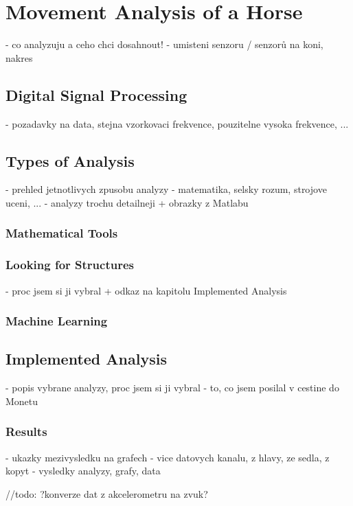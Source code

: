 \chapter{Movement Analysis of a Horse}
\label{HorseAnalysis}
- co analyzuju a ceho chci dosahnout!
- umisteni senzoru / senzorů na koni, nakres

\section{Digital Signal Processing}
- pozadavky na data, stejna vzorkovaci frekvence, pouzitelne vysoka frekvence, ...

\section{Types of Analysis}
- prehled jetnotlivych zpusobu analyzy - matematika, selsky rozum, strojove uceni, ...
- analyzy trochu detailneji + obrazky z Matlabu

\subsection{Mathematical Tools}

\subsection{Looking for Structures}
- proc jsem si ji vybral + odkaz na kapitolu Implemented Analysis

\subsection{Machine Learning}

\section{Implemented Analysis}
- popis vybrane analyzy, proc jsem si ji vybral
- to, co jsem posilal v cestine do Monetu

\subsection{Results}
- ukazky mezivysledku na grafech
- vice datovych kanalu, z hlavy, ze sedla, z kopyt
- vysledky analyzy, grafy, data


//todo: ?konverze dat z akcelerometru na zvuk?